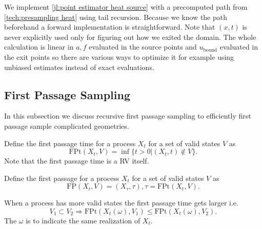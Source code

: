 \documentclass[a4paper,12pt]{article}
\begin{document}
\begin{technique}
\end{technique}

\begin{julia}\label{jl:path point estimator heat source}
  We implement \ref{jl:point estimator heat source} with a precomputed path from \ref{tech:presampling heat} using tail
  recursion. Because we know the path beforehand a forward implementation is straightforward. Note that $(x,t)$ is
  never explicitly used only for figuring out how we exited the domain. The whole calculation is linear in
  $a,f$ evaluated in the source points and $u_\text{bound}$ evaluated in the exit points so there are various
  ways to optimize it for example using unbiased estimates instead of exact evaluations.

\end{julia}


\subsection{First Passage Sampling}

In this subsection we discuss recursive first passage sampling to efficiently
first passage sample complicated geometries.


\begin{definition} \label{def:first passage time}
  Define the first passage time for a process $X_{t}$ for a set of valid states
  $V$ as
  \begin{equation}
    \text{FPt}(X_{t},V)=\inf \{t>0| (X_{t},t) \notin V \}
    .
  \end{equation}
  Note that the first passage time is a RV itself.
\end{definition}

\begin{definition} \label{def:first passage}
  Define the first passage for a process $X_{t}$ for a set of valid states
  $V$ as
  \begin{equation}
    \text{FP}(X_{t},V)=(X_{\tau},\tau), \tau = \text{FPt}(X_{t},V)
    .
  \end{equation}
\end{definition}

\begin{lemma} \label{lem: FP order}
  When a process has more valid states the first passage time gets larger i.e.
  \begin{equation}
    V_{1} \subset V_{2} \Rightarrow
    \text{FPt}(X_{t}(\omega),V_{1}) \le  \text{FPt}(X_{t}(\omega),V_{2}) .
  \end{equation}
  The $\omega$ is to indicate the same realization of $X_{t}$.
\end{lemma}
\end{document}
